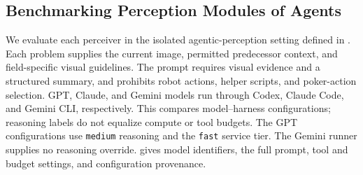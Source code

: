 \subsection{Benchmarking Perception Modules of Agents}
\label{subsec:perception_module_benchmark}

We evaluate each perceiver in the isolated agentic-perception setting defined in . Each problem supplies the current image, permitted predecessor context, and field-specific visual guidelines. The prompt requires visual evidence and a structured summary, and prohibits robot actions, helper scripts, and poker-action selection. GPT, Claude, and Gemini models run through Codex, Claude Code, and Gemini CLI, respectively. This compares model--harness configurations; reasoning labels do not equalize compute or tool budgets. The GPT configurations use \texttt{medium} reasoning and the \texttt{fast} service tier. The Gemini runner supplies no reasoning override.  gives model identifiers, the full prompt, tool and budget settings, and configuration provenance.

